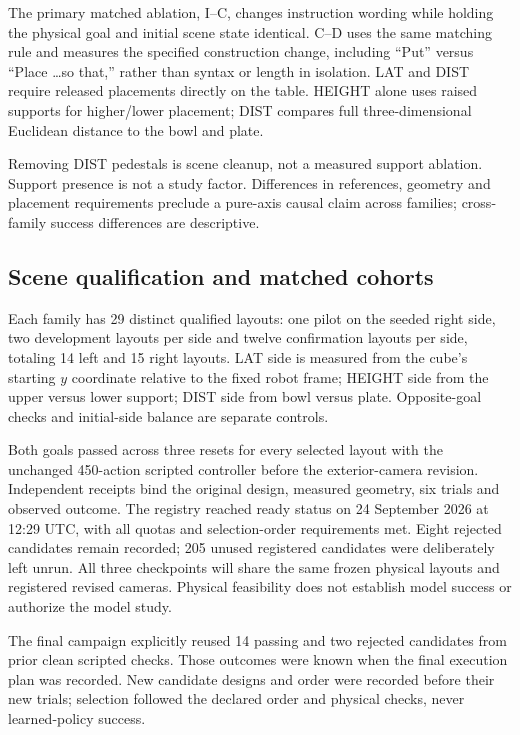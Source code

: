 The primary matched ablation, I--C, changes instruction wording while holding the physical goal and initial scene state identical. C--D uses the same matching rule and measures the specified construction change, including ``Put'' versus ``Place \ldots so that,'' rather than syntax or length in isolation. LAT and DIST require released placements directly on the table. HEIGHT alone uses raised supports for higher/lower placement; DIST compares full three-dimensional Euclidean distance to the bowl and plate.

Removing DIST pedestals is scene cleanup, not a measured support ablation. Support presence is not a study factor. Differences in references, geometry and placement requirements preclude a pure-axis causal claim across families; cross-family success differences are descriptive.

\subsection{Scene qualification and matched cohorts}
Each family has 29 distinct qualified layouts: one pilot on the seeded right side, two development layouts per side and twelve confirmation layouts per side, totaling 14 left and 15 right layouts. LAT side is measured from the cube's starting $y$ coordinate relative to the fixed robot frame; HEIGHT side from the upper versus lower support; DIST side from bowl versus plate. Opposite-goal checks and initial-side balance are separate controls.

Both goals passed across three resets for every selected layout with the unchanged 450-action scripted controller before the exterior-camera revision. Independent receipts bind the original design, measured geometry, six trials and observed outcome. The registry reached ready status on 24 September 2026 at 12:29 UTC, with all quotas and selection-order requirements met. Eight rejected candidates remain recorded; 205 unused registered candidates were deliberately left unrun. All three checkpoints will share the same frozen physical layouts and registered revised cameras. Physical feasibility does not establish model success or authorize the model study.

The final campaign explicitly reused 14 passing and two rejected candidates from prior clean scripted checks. Those outcomes were known when the final execution plan was recorded. New candidate designs and order were recorded before their new trials; selection followed the declared order and physical checks, never learned-policy success.

